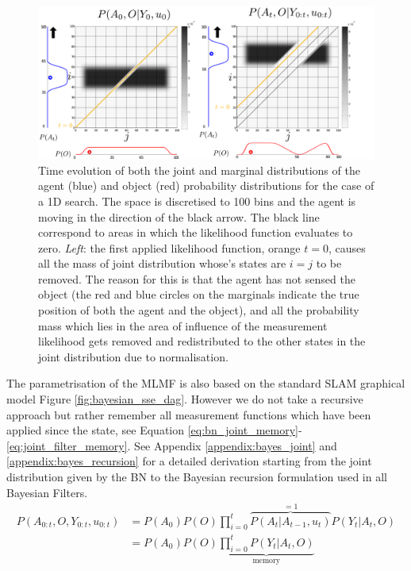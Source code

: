 \begin{figure}
 \centering
 \includegraphics[width=\textwidth]{./ch5-MLMF/Figures/Figure6.pdf}
 \caption{Time evolution of both the joint and marginal distributions of the agent (blue) and object (red) probability distributions for 
 the case of a 1D search. The space is discretised to 100 bins and the agent is moving in the direction of the black arrow. 
 The black line correspond to areas in which the likelihood function evaluates to zero.  \textit{Left}: the first applied 
 likelihood function, orange $t=0$, causes all the mass of joint distribution whose's states are $i=j$ to be removed. 
 The reason for this is that the agent has not sensed the object (the red and blue circles on the marginals indicate the true position of
 both the agent and the object), and all the probability mass which lies in the area of influence of the measurement likelihood gets 
 removed and redistributed to the other states in the joint distribution due to normalisation.}
 \label{fig:margina_joint_example}
\end{figure}

The parametrisation of the MLMF is also based on the standard SLAM graphical model Figure \ref{fig:bayesian_sse_dag}. However
we do not take a recursive approach but rather remember all measurement functions which have been applied since 
the state, see Equation \ref{eq:bn_joint_memory}-\ref{eq:joint_filter_memory}. 
See Appendix \ref{appendix:bayes_joint} and \ref{appendix:bayes_recursion} for a detailed derivation starting from the joint
distribution given by the BN to the Bayesian recursion formulation used in all Bayesian Filters.
\begin{align}
 P(A_{0:t},O,Y_{0:t},u_{0:t}) &= P(A_0)P(O)\prod_{i=0}^t \overbrace{P(A_t|A_{t-1},u_{t})}^{=1} P(Y_t|A_t,O) \nonumber \\
			      &= P(A_0)P(O) \underbrace{\prod_{i=0}^t P(Y_t|A_t,O)}_{\mathrm{memory}} \label{eq:bn_joint_memory}
\end{align}

